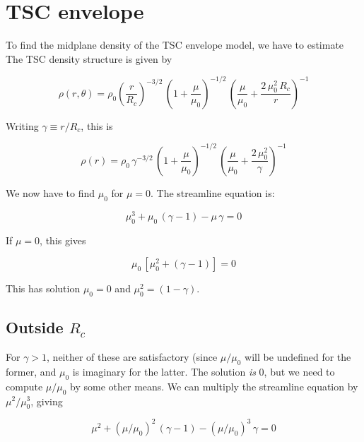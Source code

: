 \documentclass[11pt]{article}
\begin{document}
\title{}
\author{}
\date{}
\maketitle

\section{TSC envelope}

To find the midplane density of the TSC envelope model, we have to estimate 
The TSC density structure is given by

\begin{equation}
\rho(r, \theta) = \rho_0\left(\frac{r}{R_c}\right)^{-3/2}\,\left(1+\frac{\mu}{\mu_0}\right)^{-1/2} \, \left(\frac{\mu}{\mu_0} + \frac{2\,\mu_0^2\,R_c}{r}\right)^{-1}
\end{equation}

Writing $\gamma\equiv r/R_c$, this is

\begin{equation}
\rho(r) = \rho_0\,\gamma^{-3/2}\,\left(1+\frac{\mu}{\mu_0}\right)^{-1/2} \, \left(\frac{\mu}{\mu_0} + \frac{2\,\mu_0^2}{\gamma}\right)^{-1}
\end{equation}

We now have to find $\mu_0$ for $\mu=0$. The streamline equation is:

\begin{equation}
\mu_0^3 + \mu_0\,(\gamma - 1) - \mu\,\gamma = 0
\end{equation}

If $\mu=0$, this gives

\begin{equation}
\mu_0\,[\mu_0^2 + (\gamma - 1)]= 0
\end{equation}

This has solution $\mu_0 = 0$ and $\mu_0^2 = (1-\gamma)$.

\subsection{Outside $R_c$}

For $\gamma > 1$, neither of these are satisfactory (since $\mu/\mu_0$ will be undefined for the former, and $\mu_0$ is imaginary for the latter. The solution \textit{is} 0, but we need to compute $\mu/\mu_0$ by some other means. We can multiply the streamline equation by $\mu^2/\mu_0^3$, giving

\begin{equation}
\mu^2 + \left(\mu/\mu_0\right)^2\,(\gamma - 1) - \left(\mu/\mu_0\right)^3\,\gamma = 0
\end{equation}
\end{document}
